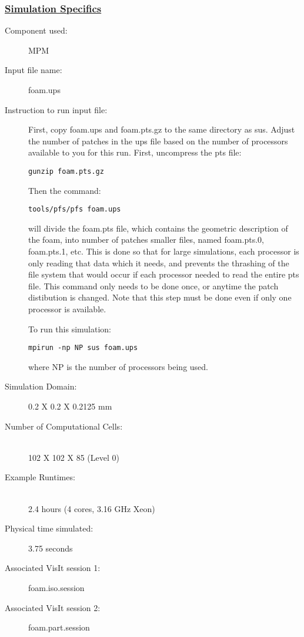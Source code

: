 \subsubsection*{\underline{Simulation Specifics}}
\begin{description} 
\item [Component used:] \hfill MPM
\item [Input file name:] \hfill foam.ups
\item [Instruction to run input file:]

First, copy foam.ups and foam.pts.gz to the same directory as sus.
Adjust the number of patches in the ups file based on
the number of processors available to you for this run.
First, uncompress the pts file:
\begin{Verbatim}[fontsize=\footnotesize]
 gunzip foam.pts.gz
\end{Verbatim}

Then the command:
\begin{Verbatim}[fontsize=\footnotesize]
 tools/pfs/pfs foam.ups
\end{Verbatim}
will divide the foam.pts
file, which contains the geometric description of the foam,
into number of patches smaller files, named foam.pts.0,
foam.pts.1, etc.  This is done so that for large simulations,
each processor is only reading that data which it needs, and
prevents the thrashing of the file system that would occur
if each processor needed to read the entire pts file.  This
command only needs to be done once, or anytime the patch
distibution is changed.  Note that this step must be done even
if only one processor is available.

To run this simulation:
\begin{Verbatim}[fontsize=\footnotesize]
  mpirun -np NP sus foam.ups
\end{Verbatim}
where NP is the number of processors being used.

\item [Simulation Domain:]\hfill  0.2 X 0.2 X 0.2125 mm

\item [Number of Computational Cells:]\hfill \\ 
102 X 102 X 85 (Level 0)

\item [Example Runtimes:] \hfill \\
2.4 hours  (4 cores, 3.16 GHz Xeon)\\

\item [Physical time simulated:] \hfill 3.75 seconds

\item [Associated VisIt session 1:] \hfill foam.iso.session
\item [Associated VisIt session 2:] \hfill foam.part.session

\end{description}

